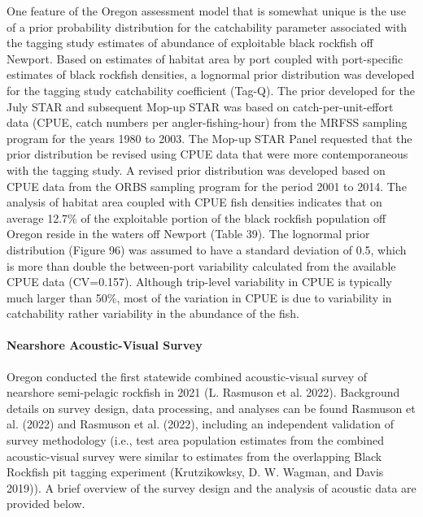 \documentclass[11pt,
  english,
  letterpaper,
]{article}
\begin{document}
One feature of the Oregon assessment model that is somewhat unique is the use of a prior probability distribution for the catchability parameter associated with the tagging study estimates of abundance of exploitable black rockfish off Newport. Based on estimates of habitat area by port coupled with port-specific estimates of black rockfish densities, a lognormal prior distribution was developed for the tagging study catchability coefficient (Tag-Q). The prior developed for the July STAR and subsequent Mop-up STAR was based on catch-per-unit-effort data (CPUE, catch numbers per angler-fishing-hour) from the MRFSS sampling program for the years 1980 to 2003. The Mop-up STAR Panel requested that the prior distribution be revised using CPUE data that were more contemporaneous with the tagging study. A revised prior distribution was developed based on CPUE data from the ORBS sampling program for the period 2001 to 2014. The analysis of habitat area coupled with CPUE fish densities indicates that on average 12.7\% of the exploitable portion of the black rockfish population off Oregon reside in the waters off Newport (Table 39). The lognormal prior distribution (Figure 96) was assumed to have a standard deviation of 0.5, which is more than double the between-port variability calculated from the available CPUE data (CV=0.157). Although trip-level variability in CPUE is typically much larger than 50\%, most of the variation in CPUE is due to variability in catchability rather variability in the abundance of the fish.

\hypertarget{nearshore-acoustic-visual-survey}{%
\paragraph{Nearshore Acoustic-Visual Survey}\label{nearshore-acoustic-visual-survey}}

Oregon conducted the first statewide combined acoustic-visual survey of nearshore semi-pelagic rockfish in 2021 (L. Rasmuson et al. 2022). Background details on survey design, data processing, and analyses can be found Rasmuson et al. (2022) and Rasmuson et al. (2022), including an independent validation of survey methodology (i.e., test area population estimates from the combined acoustic-visual survey were similar to estimates from the overlapping Black Rockfish pit tagging experiment (Krutzikowksy, D. W. Wagman, and Davis 2019)). A brief overview of the survey design and the analysis of acoustic data are provided below.
\end{document}
